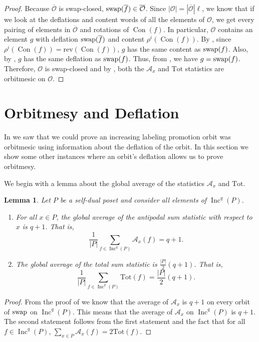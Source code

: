 \documentclass[11pt]{amsart}
\newtheorem{lemma}[theorem]{Lemma}
\theoremstyle{definition}
\newcommand{\as}{\mathcal{A}}
\newcommand{\tot}{\mathrm{Tot}}
\newcommand{\rev}{\mathrm{rev}}
\DeclareMathOperator{\Inc}{\mathrm{Inc}}
\DeclareMathOperator{\Con}{\mathrm{Con}}
\newcommand{\swap}{\textnormal{swap}}
\begin{document}
\begin{proof}
    Because $\overline{\mathcal{O}}$ is swap-closed, $\swap(\overline{f})\in\overline{\mathcal{O}}$.  Since $|\mathcal{O}|=|\overline{\mathcal{O}}| \ell$, we know that if we look at the deflations and content words of all the elements of $\mathcal{O}$, we get every pairing of elements in $\overline{\mathcal{O}}$ and rotations of $\Con(f)$.  In particular, $\mathcal{O}$ contains an element $g$ with deflation $\swap(\overline{f})$ and content $\rho^i(\Con(f))$.  By ,  since $\rho^i(\Con(f)) = \rev(\Con(f))$, $g$ has the same content as $\swap(f)$. Also, by , $g$ has the same deflation as $\swap(f)$.  Thus, from , we have $g=\swap(f)$.  Therefore, $\mathcal{O}$ is swap-closed and by , both the $\as_x$ and $\tot$ statistics are orbitmesic on $\mathcal{O}$.
\end{proof}


\section{Orbitmesy and Deflation}\label{sec:deflation}

In  we saw that we could prove an increasing labeling promotion orbit was orbitmesic using information about the deflation of the orbit.  In this section we show some other instances where an orbit's deflation allows us to prove orbitmesy.

We begin with a lemma about the global average of the statistics $\as_x$ and $\tot$.

\begin{lemma}\label{lem:GlobalAverage}
Let $P$ be a self-dual poset and consider all elements of $\Inc^q(P)$. 
\begin{enumerate}
    \item For all $x \in P$, the global average of the antipodal sum statistic with respect to $x$ is $q+1$. That is, \[
\frac{1}{\vert P\vert}\sum_{f \in \Inc^q(P)} \as_x(f) = q+1.
    \]
    \item The global average of the total sum statistic is $\frac{\vert P \vert}{2} (q+1)$. That is, \[
\frac{1}{\vert P \vert } \sum_{f \in \Inc^q(P)} \tot(f) = \frac{\vert P \vert}{2}(q+1).
    \]
\end{enumerate}
\end{lemma}

\begin{proof}
From the proof of  we know that the average of $\as_x$ is $q
+1$ on every orbit of $\swap$ on $\Inc^q(P)$.  This means that the average of $\as_x$ on $\Inc^q(P)$ is $q+1$.  The second statement follows from the first statement and the fact that for all $f\in\Inc^q(P)$, $\sum_{x\in P}\as_x(f)=2\tot(f)$.
\end{proof}
\end{document}
